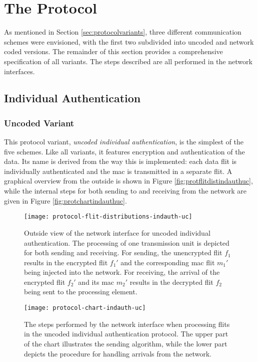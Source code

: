 \section{The Protocol}\label{sec:theprotocol}
As mentioned in Section \ref{sec:protocolvariants}, three different communication schemes were envisioned, with the first two subdivided into uncoded
and network coded versions. The remainder of this section provides a comprehensive specification of all variants. The steps described are all
performed in the network interfaces.

\subsection{Individual Authentication}\label{subsec:indauth}
\subsubsection{Uncoded Variant}
This protocol variant, \textit{uncoded individual authentication}, is the simplest of the five schemes. Like all variants, it features encryption and
authentication of the data. Its name is derived from the way this is implemented: each data flit is individually authenticated and the \gls{mac} is
transmitted in a separate flit. A graphical overview from the outside is shown in Figure \vref{fig:protflitdistindauthuc}, while the internal steps for
both sending to and receiving from the network are given in Figure \vref{fig:protchartindauthuc}.

\begin{figure}
    \centering
    \texttt{[image: protocol-flit-distributions-indauth-uc]}
    \caption[Uncoded ind. auth., outside view]{Outside view of the network interface for uncoded individual authentication. The processing of one
    transmission unit is depicted for both sending and receiving. For sending, the unencrypted flit $f_1$ results in the encrypted flit $f_1'$ and the
    corresponding \gls{mac} flit $m_1'$ being injected into the network. For receiving, the arrival of the encrypted flit $f_2'$ and its \gls{mac}
    $m_2'$ results in the decrypted flit $f_2$ being sent to the processing element.}
    \label{fig:protflitdistindauthuc}
\end{figure}

\begin{figure}
    \centering
    \texttt{[image: protocol-chart-indauth-uc]}
    \caption[Uncoded ind. auth., detailed procedure]{The steps performed by the network interface when processing flits in the uncoded individual
    authentication protocol. The upper part of the chart illustrates the sending algorithm, while the lower part depicts the procedure for handling
    arrivals from the network.}
    \label{fig:protchartindauthuc}
\end{figure}

